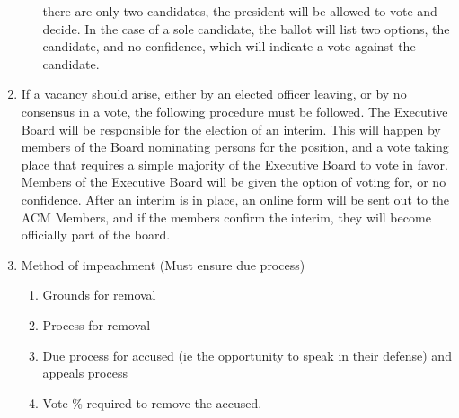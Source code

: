 \begin{enumerate}[label=\Alph*.]
\begin{enumerate}[label=\arabic*.]
      there are only two candidates, the president will be allowed to vote and
      decide. In the case of a sole candidate, the ballot will list two options,
      the candidate, and no confidence, which will indicate a vote against the candidate.
    \end{enumerate}
  \item If a vacancy should arise, either by an elected officer leaving, or by
  no consensus in a vote, the following procedure must be followed. The
  Executive Board will be responsible for the election of an interim. This will
  happen by members of the Board nominating persons for the position, and a vote
  taking place that requires a simple majority of the Executive Board to vote in
  favor. Members of the Executive Board will be given the option of voting for,
  or no confidence. After an interim is in place, an online form will be sent
  out to the ACM Members, and if the members confirm the interim, they will
  become officially part of the board.
  \item Method of impeachment (Must ensure due process)
    \begin{enumerate}[label=\arabic*.]
      \item Grounds for removal
      \item Process for removal
      \item Due process for accused (ie the opportunity to speak in their
      defense) and appeals process
      \item Vote \% required to remove the accused.
    \end{enumerate}
  \end{enumerate}